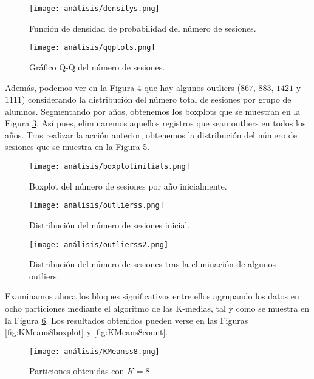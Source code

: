 \begin{figure}[H]
    \centering
    \texttt{[image: análisis/densitys.png]}
    \caption{Función de densidad de probabilidad del número de sesiones.}
    \label{fig:densitysessions}
\end{figure}


\begin{figure}[H]
    \centering
    \texttt{[image: análisis/qqplots.png]}
    \caption{Gráfico Q-Q del número de sesiones.}
    \label{fig:q-qsessions}
\end{figure}

Además, podemos ver en la Figura \ref{fig:outlierss} que hay algunos outliers ($867$, $883$, $1421$ y $1111$) considerando la distribución del número total de sesiones por grupo de alumnos. Segmentando por años, obtenemos los boxplots que se muestran en la Figura \ref{fig:boxplotsessionsyearinitial}. Así pues, eliminaremos aquellos registros que sean outliers en todos los años. Tras realizar la acción anterior, obtenemos la distribución del número de sesiones que se muestra en la Figura \ref{fig:outlierss2}.

\begin{figure}[H]
    \centering
    \texttt{[image: análisis/boxplotinitials.png]}
    \caption{Boxplot del número de sesiones por año inicialmente.}
    \label{fig:boxplotsessionsyearinitial}
\end{figure}

\begin{figure}[H]
    \centering
    \texttt{[image: análisis/outlierss.png]}
    \caption{Distribución del número de sesiones inicial.}
    \label{fig:outlierss}
\end{figure}

\begin{figure}[H]
    \centering
    \texttt{[image: análisis/outlierss2.png]}
    \caption{Distribución del número de sesiones tras la eliminación de algunos outliers.}
    \label{fig:outlierss2}
\end{figure}

Examinamos ahora los bloques significativos entre ellos agrupando los datos en ocho particiones mediante el algoritmo de las K-medias, tal y como se muestra en la Figura \ref{fig:KMeans8}. Los resultados obtenidos pueden verse en las Figuras \ref{fig:KMeans8boxplot} y \ref{fig:KMeans8count}.

\begin{figure}[H]
    \centering
    \texttt{[image: análisis/KMeanss8.png]}
    \caption{Particiones obtenidas con $K = 8$.}
    \label{fig:KMeans8}
\end{figure}

